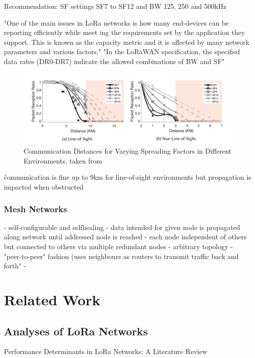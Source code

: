 \documentclass[a4paper,twoside,12pt]{report}
\begin{document}
Recommendation: SF settings SF7 to SF12 and BW 125, 250 and 500kHz \cite{SemtechDatasheet}

\cite{Gkotsiopoulos2021PerformanceReview} "One of the main issues in LoRa networks is how many end-devices can be reporting efficiently while meet ing the requirements set by the application they support. This is known as the capacity metric and it is affected by many network parameters and various factors."
"In the LoRaWAN specification, the specified data rates (DR0-DR7) indicate the allowed combinations of BW and SF"

\begin{figure}[ht]
	\centering
	\includegraphics[width=0.8\linewidth]{images/LoRa_propagation_line_of_sight.png}
	\caption{Communication Distances for Varying Spreading Factors in Different Environments, taken from \cite{Liando2019KnownStudy}}
	\label{fig:LoRaTransmissionSpectogram}
\end{figure}

\^ communication is fine up to 9km for line-of-sight environments but propagation is impacted when obstructed

\subsubsection{Mesh Networks}

- self-configurable and selfhealing
- data intended for given node is propagated along network until addressed node is reached
- each node independent of others but connected to others via multiple redundant nodes
- arbitrary topology
- "peer-to-peer" fashion (uses neighbours as routers to transmit traffic back and forth"
- 

\section{Related Work}


\subsection{Analyses of LoRa Networks}
Performance Determinants in LoRa Networks: A Literature Review \cite{Gkotsiopoulos2021PerformanceReview}
\end{document}
